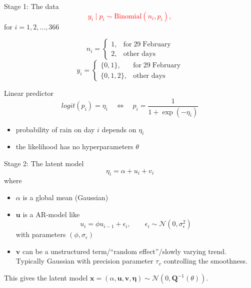 \documentclass[
  ignorenonframetext,
]{beamer}
\providecommand{\tightlist}{%
  \setlength{\itemsep}{0pt}\setlength{\parskip}{0pt}}
\begin{document}
\begin{frame}{Stage 1: The data}
\protect\hypertarget{stage-1-the-data}{}
\textcolor{red}{
$$
y_i\mid p_i \sim \text{Binomial}(n_i, p_i),
$$} for \(i=1,2,...,366\)

\[
n_{i} = \left\{
 \begin{array}{lr}
1, & \text{for}\; 29\; \text{February}\\
2, & \text{other days}
\end{array}\right.
\] \[
y_{i} =
\begin{cases}
\{0,1\}, & \text{for}\; 29\; \text{February}\\
\{0,1,2\}, & \text{other days}
 \end{cases}
\]

Linear predictor \[
logit(p_i) = \eta_i \quad \Leftrightarrow \quad p_i = \frac{1}{1+\exp(-\eta_i)}
\]

\begin{itemize}
\tightlist
\item
  probability of rain on day \(i\) depends on \(\eta_i\)
\item
  the likelihood has no hyperparameters \(\theta\)
\end{itemize}
\end{frame}

\begin{frame}{Stage 2: The latent model}
\protect\hypertarget{stage-2-the-latent-model}{}
\[
\eta_i = \alpha +  u_i + v_i
\] where

\begin{itemize}[<+->]
\tightlist
\item
  \(\alpha\) is a global mean (Gaussian)
\end{itemize}

\begin{itemize}[<+->]
\tightlist
\item
  \(\mathbf{u}\) is a AR-model like \[
  u_i  = \phi u_{i-1} + \epsilon_i, \qquad \epsilon_i\sim\mathcal{N}(0, \sigma^2_{\epsilon})
  \] with parameters \((\phi, \sigma_{\epsilon})\)
\end{itemize}

\begin{itemize}[<+->]
\tightlist
\item
  \(\mathbf{v}\) can be a unstructured term/``random effect''/slowly
  varying trend. Typically Gaussian with precision parameter \(\tau_v\)
  controlling the smoothness.
\end{itemize}

\pause

This gives the latent model
\(\mathbf{x} = (\alpha, \mathbf{u}, \mathbf{v}, \mathbf{\eta})\sim\mathcal{N}(0, \mathbf{Q}^{-1}(\theta))\).
\end{frame}
\end{document}
